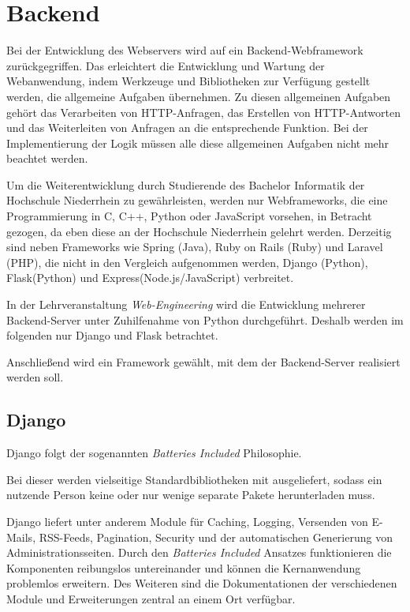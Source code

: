 \section{Backend} \label{sec:Backend}
Bei der Entwicklung des Webservers wird auf ein Backend-Webframework zurückgegriffen. Das erleichtert die Entwicklung und Wartung der Webanwendung, indem Werkzeuge und Bibliotheken zur Verfügung gestellt werden, die allgemeine Aufgaben übernehmen. Zu diesen allgemeinen Aufgaben gehört das Verarbeiten von HTTP-Anfragen, das Erstellen von HTTP-Antworten und das Weiterleiten von Anfragen an die entsprechende Funktion. Bei der Implementierung der Logik müssen alle diese allgemeinen Aufgaben nicht mehr beachtet werden. \cite{mdncontributorsServersideWebFrameworks2020}

Um die Weiterentwicklung durch Studierende des Bachelor Informatik der Hochschule Niederrhein zu gewährleisten, werden nur Webframeworks, die eine Programmierung in C, C++, Python oder JavaScript vorsehen, in Betracht gezogen, da eben diese an der Hochschule Niederrhein gelehrt werden. Derzeitig sind neben Frameworks wie Spring (Java), Ruby on Rails (Ruby) und Laravel (PHP), die nicht in den Vergleich aufgenommen werden, Django (Python), Flask(Python) und Express(Node.js/JavaScript) verbreitet. \cite{mdncontributorsServersideWebFrameworks2020}

In der Lehrveranstaltung \textit{Web-Engineering} wird die Entwicklung mehrerer Backend-Server unter Zuhilfenahme von Python durchgeführt. Deshalb werden im folgenden nur Django und Flask betrachtet. 

Anschließend wird ein Framework gewählt, mit dem der Backend-Server realisiert werden soll.

\subsection{Django}\label{subsec:Django}
Django folgt der sogenannten \textit{Batteries Included} Philosophie. 

Bei dieser werden vielseitige Standardbibliotheken mit ausgeliefert, sodass ein nutzende Person keine oder nur wenige separate Pakete herunterladen muss. \cite{kuchlingPEP206Python}

Django liefert unter anderem Module für Caching, Logging, Versenden von E-Mails, RSS-Feeds, Pagination, Security und der automatischen Generierung von Administrationsseiten. \cite{djangoDjangoDocumentationDjango} Durch den \textit{Batteries Included} Ansatzes funktionieren die Komponenten reibungslos untereinander und können die Kernanwendung problemlos erweitern. Des Weiteren sind die Dokumentationen der verschiedenen Module und Erweiterungen zentral an einem Ort verfügbar. 

